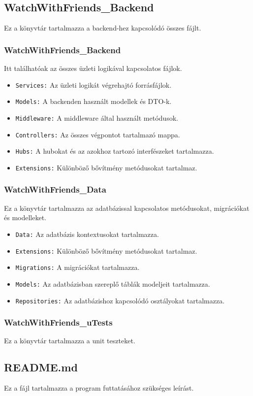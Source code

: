 \subsection*{WatchWithFriends\_Backend}
Ez a könyvtár tartalmazza a backend-hez kapcsolódó összes fájlt.

\subsubsection*{WatchWithFriends\_Backend}
Itt találhatóak az összes üzleti logikával kapcsolatos fájlok.

\begin{itemize}
\item \texttt{Services:} Az üzleti logikát végrehajtó forrásfájlok.
\item \texttt{Models:} A backenden használt modellek és DTO-k.
\item \texttt{Middleware:} A middleware által használt metódusok.
\item \texttt{Controllers:} Az összes végpontot tartalmazó mappa.
\item \texttt{Hubs:} A hubokat és az azokhoz tartozó interfészeket tartalmazza.
\item \texttt{Extensions:} Különböző bővítmény metódusokat tartalmaz.
\end{itemize}

\subsubsection*{WatchWithFriends\_Data}
Ez a könyvtár tartalmazza az adatbázissal kapcsolatos metódusokat, migrációkat és modelleket.

\begin{itemize}
\item \texttt{Data:} Az adatbázis kontextusokat tartalmazza.
\item \texttt{Extensions:} Különböző bővítmény metódusokat tartalmaz.
\item \texttt{Migrations:} A migrációkat tartalmazza.
\item \texttt{Models:} Az adatbázisban szereplő táblák modeljeit tartalmazza.
\item \texttt{Repositories:} Az adatbázishoz kapcsolódó osztályokat tartalmazza.
\end{itemize}

\subsubsection*{WatchWithFriends\_uTests}
Ez a könyvtár tartalmazza a unit teszteket.

\subsection*{README.md}
Ez a fájl tartalmazza a program futtatásához szükséges leírást.